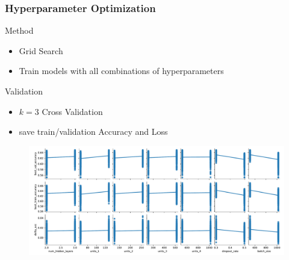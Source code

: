 \begin{frame}
    \frametitle{Hyperparameter Optimization}
    
    \begin{alertblock}{Method}
        \begin{itemize}
            \item Grid Search
            \item Train models with all combinations of hyperparameters
        \end{itemize}    
    \end{alertblock}

    \begin{alertblock}{Validation}
        \begin{itemize}
            \item $k=\num{3}$ Cross Validation
            \item save train/validation Accuracy and Loss
        \end{itemize}
    \end{alertblock}

    \begin{figure}
        \includegraphics[scale=0.3]{../figures/HPO_parameter.pdf}
    \end{figure}

\end{frame}